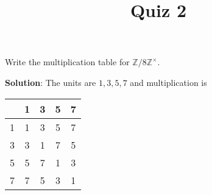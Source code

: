\documentclass[12pt]{amsart}
\theoremstyle{definition}
\begin{document}
\title{Quiz 2}

\maketitle

Write the multiplication table for $\mathbb{Z}/8\mathbb{Z}^\times$.

\textbf{Solution}: The units are $1,3,5,7$ and multiplication is 
\begin{center}
	\begin{tabular}{ | c | c | c | c | c |}
		\hline 
		& 1 & 3 & 5 & 7 \\
		\hline
		1 & 1 & 3 & 5 & 7 \\
		\hline
		3 & 3 & 1 & 7 & 5 \\
		\hline
		5 & 5 & 7 & 1 & 3 \\
		\hline
		7 & 7 & 5 & 3 & 1 \\
		\hline
\end{tabular}
	
\end{center}
	
\end{document}
